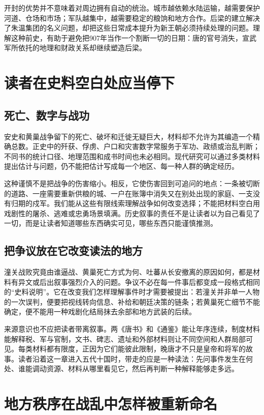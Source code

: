 开封的优势并不意味着对周边拥有自动的统治。城市越依赖水陆运输，越需要保护河道、仓场和市场；军队越集中，越需要稳定的粮饷和地方合作。后梁的建立解决了朱温集团的名义问题，却把这些日常成本提升为新王朝必须持续处理的问题。理解这种前史，有助于避免把907年当作一个割断一切的日期：唐的官号消失，宣武军所依托的地理和财政关系却继续塑造后梁。

\section{读者在史料空白处应当停下}

\subsection{死亡、数字与战功}
安史和黄巢战争留下的死亡、破坏和迁徙无疑巨大，材料却不允许为其编造一个精确总数。正史中的歼获、俘虏、户口和灾害数字常服务于军功、政绩或治乱判断；不同书的统计口径、地理范围和成书时间也未必相同。现代研究可以通过多类材料提出估计与问题，仍不能把估计写成每一个地区、每一种人群的确定经历。

这种谨慎不是把战争的伤害缩小。相反，它使伤害回到可追问的地点：一条被切断的道路、一座需要重新供粮的城、一户在账簿中消失又在别处出现的家庭、一支没有归期的戍军。我们能从这些有限线索理解战争如何改变选择；不能把材料空白用戏剧性的屠杀、逃难或忠勇场景填满。历史叙事的责任不是让读者以为自己看见了一切，而是让读者知道哪些东西确实可见，哪些东西只能谨慎推测。

\subsection{把争议放在它改变读法的地方}
潼关战败究竟由谁逼战、黄巢死亡方式为何、吐蕃从长安撤离的原因如何，都是材料有异文或后出叙事强烈介入的问题。争议不必在每一件事后都变成一段格式相同的“史料说明”。它在改变我们怎样理解事件时才需要被提出：若潼关并非单一人物的一次误判，便要把视线转向信息、补给和朝廷决策的链条；若黄巢死亡细节不能确定，便不能用一种戏剧化结局抹去余部和地方武装的后续。

来源意识也不应把读者带离叙事。两《唐书》和《通鉴》能让年序连续，制度材料能解释税、军与官制，文书、碑志、遗址和外部材料则让不同空间和人群局部可见。每类材料都有限度，正因为它们能彼此限制，晚唐才不只是皇帝和将军的故事。读者沿着这一章进入五代十国时，带走的应是一种读法：先问事件发生在何处、谁能调动资源、材料从哪里看见它，然后再判断一种解释能够走多远。

\section{地方秩序在战乱中怎样被重新命名}

